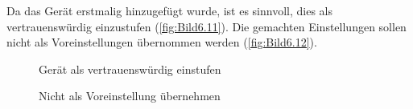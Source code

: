 Da das Gerät erstmalig hinzugefügt wurde, ist es sinnvoll, dies als vertrauenswürdig einzustufen (\autoref{fig:Bild6.11}). Die gemachten Einstellungen sollen nicht als Voreinstellungen übernommen werden (\autoref{fig:Bild6.12}).  
\begin{figure}[H]
   \centering
   \caption[Gerät als vertrauenswürdig einstufen]{Gerät als vertrauenswürdig einstufen}
   \label{fig:Bild6.11}
\end{figure}

\begin{figure}[H]
   \centering
   \caption[Nicht als Voreinstellung übernehmen]{Nicht als Voreinstellung übernehmen}
   \label{fig:Bild6.12}
\end{figure}

\clearpage

